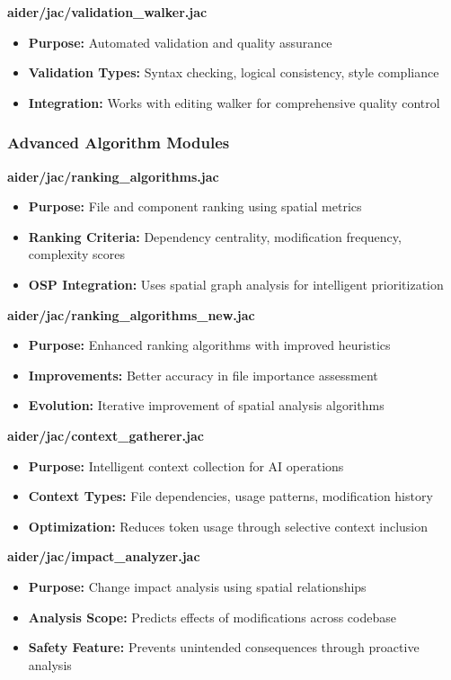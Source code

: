 \documentclass[12pt,a4paper]{article}
\begin{document}
\textbf{aider/jac/validation\_walker.jac}
\begin{itemize}
    \item \textbf{Purpose:} Automated validation and quality assurance
    \item \textbf{Validation Types:} Syntax checking, logical consistency, style compliance
    \item \textbf{Integration:} Works with editing walker for comprehensive quality control
\end{itemize}

\subsubsection{Advanced Algorithm Modules}

\textbf{aider/jac/ranking\_algorithms.jac}
\begin{itemize}
    \item \textbf{Purpose:} File and component ranking using spatial metrics
    \item \textbf{Ranking Criteria:} Dependency centrality, modification frequency, complexity scores
    \item \textbf{OSP Integration:} Uses spatial graph analysis for intelligent prioritization
\end{itemize}

\textbf{aider/jac/ranking\_algorithms\_new.jac}
\begin{itemize}
    \item \textbf{Purpose:} Enhanced ranking algorithms with improved heuristics
    \item \textbf{Improvements:} Better accuracy in file importance assessment
    \item \textbf{Evolution:} Iterative improvement of spatial analysis algorithms
\end{itemize}

\textbf{aider/jac/context\_gatherer.jac}
\begin{itemize}
    \item \textbf{Purpose:} Intelligent context collection for AI operations
    \item \textbf{Context Types:} File dependencies, usage patterns, modification history
    \item \textbf{Optimization:} Reduces token usage through selective context inclusion
\end{itemize}

\textbf{aider/jac/impact\_analyzer.jac}
\begin{itemize}
    \item \textbf{Purpose:} Change impact analysis using spatial relationships
    \item \textbf{Analysis Scope:} Predicts effects of modifications across codebase
    \item \textbf{Safety Feature:} Prevents unintended consequences through proactive analysis
\end{itemize}
\end{document}
